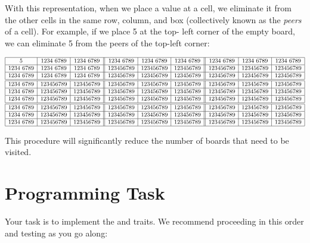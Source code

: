 \documentclass[9pt]{extbook}
\begin{document}
With this representation, when we place a value at a cell, we eliminate it
from the other cells in the same row, column, and box (collectively known
as the \emph{peers} of a cell). For example, if we place 5 at the top-
left corner of the empty board, we can eliminate 5 from the peers of the
top-left corner:


\[
\small
\begin{array}{|c|c|c||c|c|c||c|c|c|}
\hline
5 & 1234~6789 & 1234~6789 & 1234~6789 & 1234~6789 & 1234~6789 & 1234~6789 & 1234~6789 & 1234~6789 \\
\hline
1234~6789 & 1234~6789 & 1234~6789 & 123456789 & 123456789 & 123456789 & 123456789 & 123456789 & 123456789 \\
\hline
1234~6789 & 1234~6789 & 1234~6789 & 123456789 & 123456789 & 123456789 & 123456789 & 123456789 & 123456789 \\
\hline \hline
1234~6789 & 123456789 & 123456789 & 123456789 & 123456789 & 123456789 & 123456789 & 123456789 & 123456789 \\
\hline
1234~6789 & 123456789 & 123456789 & 123456789 & 123456789 & 123456789 & 123456789 & 123456789 & 123456789 \\
\hline
1234~6789 & 123456789 & 123456789 & 123456789 & 123456789 & 123456789 & 123456789 & 123456789 & 123456789 \\
\hline \hline
1234~6789 & 123456789 & 123456789 & 123456789 & 123456789 & 123456789 & 123456789 & 123456789 & 123456789 \\
\hline
1234~6789 & 123456789 & 123456789 & 123456789 & 123456789 & 123456789 & 123456789 & 123456789 & 123456789 \\
\hline
1234~6789 & 123456789 & 123456789 & 123456789 & 123456789 & 123456789 & 123456789 & 123456789 & 123456789 \\
\hline
\end{array}
\]

This procedure will significantly reduce the number of boards that need to
be visited.
\section{Programming Task}


Your task is to implement the  and
 traits.
We recommend proceeding in this order and testing as you go along:
\end{document}
